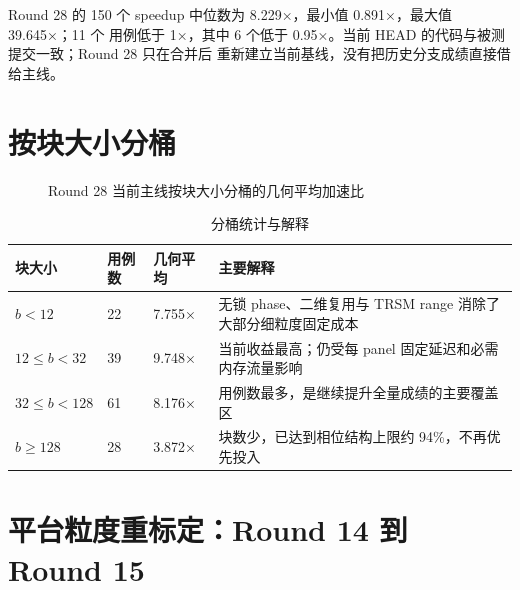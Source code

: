 \documentclass[UTF8,a4paper,openany,11pt,fontset=fandol]{ctexrep}
\begin{document}
Round 28 的 150 个 speedup 中位数为 8.229×，最小值 0.891×，最大值 39.645×；11 个
用例低于 1×，其中 6 个低于 0.95×。当前 HEAD 的代码与被测提交一致；Round 28 只在合并后
重新建立当前基线，没有把历史分支成绩直接借给主线。

\section{按块大小分桶}

\begin{figure}[H]
  \centering
  \caption{Round 28 当前主线按块大小分桶的几何平均加速比}
\end{figure}

\begin{table}[H]
  \centering
  \caption{分桶统计与解释}
  \begin{tabularx}{\textwidth}{L{2.6cm}C{1.4cm}C{2.1cm}Y}
    \toprule
    块大小 & 用例数 & 几何平均 & 主要解释 \\
    \midrule
    \(b<12\) & 22 & 7.755× & 无锁 phase、二维复用与 TRSM range 消除了大部分细粒度固定成本 \\
    \(12\le b<32\) & 39 & 9.748× & 当前收益最高；仍受每 panel 固定延迟和必需内存流量影响 \\
    \(32\le b<128\) & 61 & 8.176× & 用例数最多，是继续提升全量成绩的主要覆盖区 \\
    \(b\ge128\) & 28 & 3.872× & 块数少，已达到相位结构上限约 94\%，不再优先投入 \\
    \bottomrule
  \end{tabularx}
\end{table}

\section{平台粒度重标定：Round 14 到 Round 15}
\end{document}
